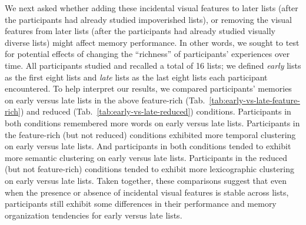 \documentclass[11pt]{article}
\newcommand{\abbreviations}{S1}
\begin{document}
\begin{table}[tp]
\centering
\tiny


\caption{\textbf{Comparing memory for early versus late lists in the
reduced (early) condition.} The $t$-tests reported in the table were carried out
across-participants. Abbreviations used in this table are defined in
Table~\abbreviations.}

\label{tab:early-vs-late-early}
\end{table}

\begin{table}[tp]
\centering
\tiny


\caption{\textbf{Comparing memory for early versus late lists in the
reduced (late) condition.} The $t$-tests reported in the table were carried out
across-participants. Abbreviations used in this table are defined in
Table~\abbreviations.}

\label{tab:early-vs-late-late}
\end{table}

We next asked whether adding these incidental visual features to later lists
(after the participants had already studied impoverished lists), or removing
the visual features from later lists (after the participants had already
studied visually diverse lists) might affect memory performance. In other
words, we sought to test for potential effects of changing the ``richness'' of
participants' experiences over time. All participants studied and recalled a
total of 16 lists; we defined \textit{early} lists as the first eight lists and
\textit{late} lists as the last eight lists each participant encountered. To
help interpret our results, we compared participants' memories on early versus
late lists in the above feature-rich
(Tab.~\ref{tab:early-vs-late-feature-rich}) and reduced
(Tab.~\ref{tab:early-vs-late-reduced}) conditions. Participants in both
conditions remembered more words on early versus late lists. Participants in
the feature-rich (but not reduced) conditions exhibited more temporal
clustering on early versus late lists. And participants in both conditions
tended to exhibit more semantic clustering on early versus late lists.
Participants in the reduced (but not feature-rich) conditions tended to exhibit
more lexicographic clustering on early versus late lists. Taken together, these
comparisons suggest that even when the presence or absence of incidental visual
features is stable across lists, participants still exhibit some differences in
their performance and memory organization tendencies for early versus late
lists.
\end{document}
